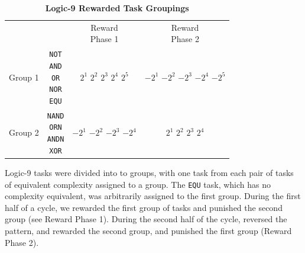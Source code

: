 \documentclass[letterpaper]{article}
\begin{document}
	\begin{table}[]
	\centering
	\caption{\textbf{Logic-9 Rewarded Task Groupings}}
	\label{hgt-treatments-logic9-h}

	\begin{tabular}{|c|c|c|c|}
	\hline
	 & \thead{Tasks} & \thead{Reward \\ Phase 1} & \thead{Reward \\ Phase 2} \\\hhline{|=|=|=|=|}
	 Group 1 & \makecell{ \texttt{NOT} \\ \texttt{AND} \\ \texttt{OR} \\ \texttt{NOR} \\ \texttt{EQU} } & \makecell{ $2^1$ \\ $2^2$ \\ $2^3$ \\ $2^4$ \\ $2^5$ } & \makecell{ $-2^{1}$ \\ $-2^{2}$ \\ $-2^{3}$ \\ $-2^{4}$ \\ $-2^{5}$ } \\\hline
	 Group 2 & \makecell{ \texttt{NAND} \\ \texttt{ORN} \\ \texttt{ANDN} \\ \texttt{XOR} } & \makecell{ $-2^{1}$ \\ $-2^{2}$ \\ $-2^{3}$ \\ $-2^{4}$ } & \makecell{ $2^1$ \\ $2^2$ \\ $2^3$ \\ $2^4$ } \\\hline
	\end{tabular} 

	\begin{flushleft}Logic-9 tasks were divided into to groups, with one task from each pair of tasks of equivalent complexity assigned to a group. The \texttt{EQU} task, which has no complexity equivalent, was arbitrarily assigned to the first group. During the first half of a cycle, we rewarded the first group of tasks and punished the second group (see Reward Phase 1). During the second half of the cycle, reversed the pattern, and rewarded the second group, and punished the first group (Reward Phase 2).  
	\end{flushleft}
	\label{hgt-treatments-logic9}
	\end{table}
\end{document}
